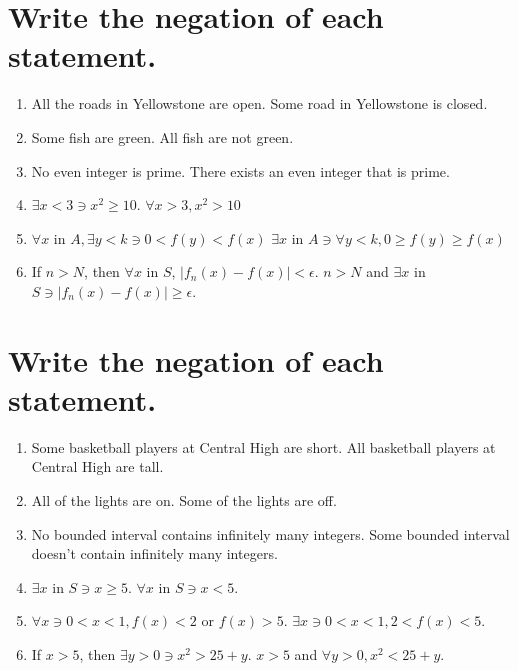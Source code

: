 \documentclass[11pt]{article} %
\begin{document}
\section{Write the negation of each statement.}
\begin{enumerate}
\item All the roads in Yellowstone are open.
\subitem Some road in Yellowstone is closed.
\item Some fish are green.
\subitem All fish are not green.
\item No even integer is prime.
\subitem There exists an even integer that is prime.
\item $\exists x<3\ni x^2 \geq 10$.
\subitem $\forall x>3, x^2>10$
\item $\forall x$ in $A, \exists y <k \ni 0 <f(y)<f(x)$
\subitem $\exists x$ in $A \ni \forall y<k,0\geq f(y)\geq f(x)$
\item If $n>N$, then $\forall x$ in $S$, $\mid f_n(x)-f(x)\mid<\epsilon$.
\subitem $n>N$ and $\exists x$ in $S \ni \mid f_n(x)-f(x)\mid\geq\epsilon$.
\end{enumerate}

\section{Write the negation of each statement.}
\begin{enumerate}
\item Some basketball players at Central High are short.
\subitem All basketball players at Central High are tall.
\item All of the lights are on.
\subitem Some of the lights are off.
\item No bounded interval contains infinitely many integers.
\subitem Some bounded interval doesn't contain infinitely many integers.
\item $\exists x$ in $S \ni x \geq 5$.
\subitem $\forall x$ in $S \ni x<5$.
\item $\forall x \ni 0 <x<1, f(x)<2$ or $ f(x)>5$.
\subitem$\exists x \ni 0<x<1, 2<f(x)<5$.
\item If $x>5$, then $\exists y>0\ni x^2>25+y$.
\subitem $x>5$ and $\forall y>0, x^2<25+y$.
\end{enumerate}
\end{document}
